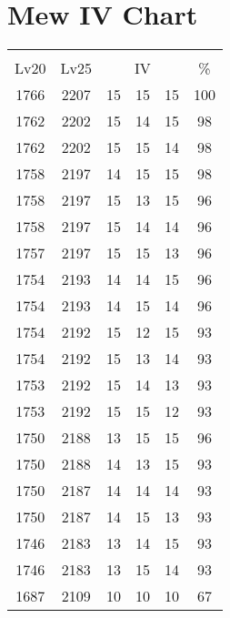 \documentclass{article}%
\begin{document}
%
\normalsize%
\section{Mew IV Chart}%
\label{sec:Mew IV Chart}%
\renewcommand{\arraystretch}{1.5}%
\begin{tabular}{|c|c|c|c|c|c|}%
\hline%
\multicolumn{6}{|c|}{\textcolor{white}{ 
\linebreak{Mew}
}%
\cellcolor{black}}\\%
\multicolumn{1}{|c}{Lv20}&\multicolumn{1}{c|}{Lv25}&\multicolumn{3}{c|}{IV}&\multicolumn{1}{|c|}{\%}\\%
\hline%
\rowcolor{color100}%
1766&2207&15&15&15&100\\%
\hline%
\rowcolor{color98}%
1762&2202&15&14&15&98\\%
\hline%
\rowcolor{color98}%
1762&2202&15&15&14&98\\%
\hline%
\rowcolor{color98}%
1758&2197&14&15&15&98\\%
\hline%
\rowcolor{color96}%
1758&2197&15&13&15&96\\%
\hline%
\rowcolor{color96}%
1758&2197&15&14&14&96\\%
\hline%
\rowcolor{color96}%
1757&2197&15&15&13&96\\%
\hline%
\rowcolor{color96}%
1754&2193&14&14&15&96\\%
\hline%
\rowcolor{color96}%
1754&2193&14&15&14&96\\%
\hline%
\rowcolor{color93}%
1754&2192&15&12&15&93\\%
\hline%
\rowcolor{color93}%
1754&2192&15&13&14&93\\%
\hline%
\rowcolor{color93}%
1753&2192&15&14&13&93\\%
\hline%
\rowcolor{color93}%
1753&2192&15&15&12&93\\%
\hline%
\rowcolor{color96}%
1750&2188&13&15&15&96\\%
\hline%
\rowcolor{color93}%
1750&2188&14&13&15&93\\%
\hline%
\rowcolor{color93}%
1750&2187&14&14&14&93\\%
\hline%
\rowcolor{color93}%
1750&2187&14&15&13&93\\%
\hline%
\rowcolor{color93}%
1746&2183&13&14&15&93\\%
\hline%
\rowcolor{color93}%
1746&2183&13&15&14&93\\%
\hline%
\rowcolor{color91}%
1687&2109&10&10&10&67\\%
\end{tabular}

%
\end{document}
